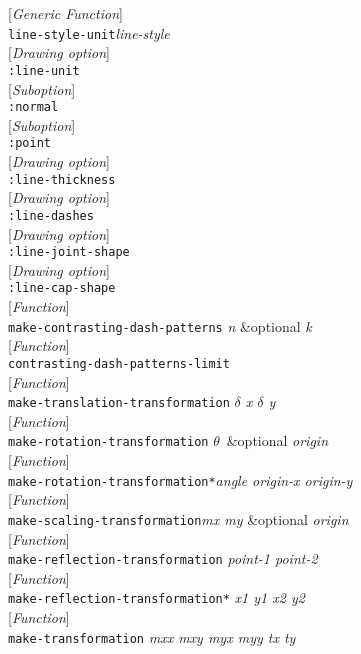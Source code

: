 \documentclass[10pt]{book}
\newenvironment{defother}[2]{[\textit{#1}]\\\texttt{#2}}{\\}
\newenvironment{defun}[1]{\begin{defother}{Function}{#1}}{\end{defother}}
\newenvironment{defgeneric}[1]{\begin{defother}{Generic Function}{#1}}{\end{defother}}
\begin{document}
\begin{defgeneric}{line-style-unit}\textit{line-style}\end{defgeneric}
\begin{defother}{Drawing option}{:line-unit}\end{defother}
\begin{defother}{Suboption}{:normal}\end{defother}
\begin{defother}{Suboption}{:point}\end{defother}
\begin{defother}{Drawing option}{:line-thickness}\end{defother}
\begin{defother}{Drawing option}{:line-dashes}\end{defother}
\begin{defother}{Drawing option}{:line-joint-shape}\end{defother}
\begin{defother}{Drawing option}{:line-cap-shape}\end{defother}
\begin{defun}{make-contrasting-dash-patterns} \textit{n} \&optional \textit{k}\end{defun}
\begin{defun}{contrasting-dash-patterns-limit}\end{defun}
\begin{defun}{make-translation-transformation} \textit{$\delta$ x $\delta$ y}\end{defun}
\begin{defun}{make-rotation-transformation} \textit{$\theta$}\ \&optional \textit{origin}\end{defun}
\begin{defun}{make-rotation-transformation*}\textit{angle origin-x origin-y}\end{defun}
\begin{defun}{make-scaling-transformation}\textit{mx my} \&optional \textit{origin}\end{defun}
\begin{defun}{make-reflection-transformation} \textit{point-1 point-2}\end{defun}
\begin{defun}{make-reflection-transformation*} \textit{x1 y1 x2 y2}\end{defun}
\begin{defun}{make-transformation} \textit{mxx mxy myx myy tx ty}\end{defun}
\end{document}
